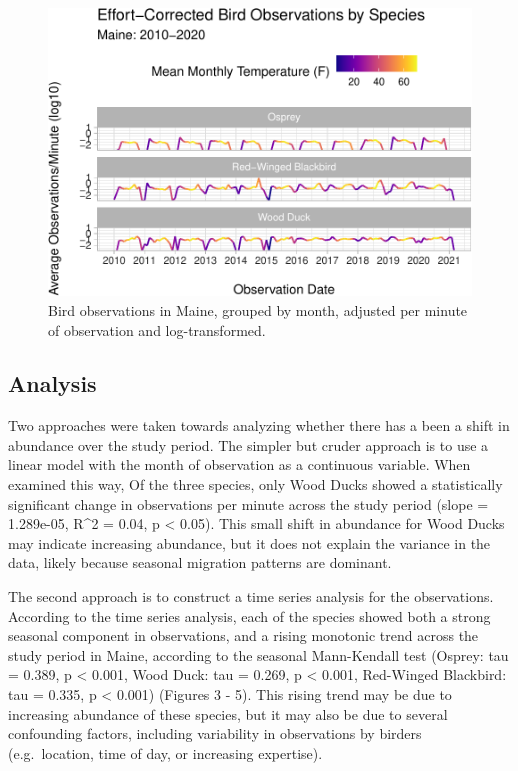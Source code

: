 \documentclass[
  12pt,
]{article}
\begin{document}
\begin{figure}
\centering
\includegraphics{Project_report_ME_files/figure-latex/monthly.log.effort-1.pdf}
\caption{Bird observations in Maine, grouped by month, adjusted per
minute of observation and log-transformed.}
\end{figure}

\newpage

\hypertarget{analysis}{%
\subsection{Analysis}\label{analysis}}

Two approaches were taken towards analyzing whether there has a been a
shift in abundance over the study period. The simpler but cruder
approach is to use a linear model with the month of observation as a
continuous variable. When examined this way, Of the three species, only
Wood Ducks showed a statistically significant change in observations per
minute across the study period (slope = 1.289e-05, R\^{}2 = 0.04, p
\textless{} 0.05). This small shift in abundance for Wood Ducks may
indicate increasing abundance, but it does not explain the variance in
the data, likely because seasonal migration patterns are dominant.

The second approach is to construct a time series analysis for the
observations. According to the time series analysis, each of the species
showed both a strong seasonal component in observations, and a rising
monotonic trend across the study period in Maine, according to the
seasonal Mann-Kendall test (Osprey: tau = 0.389, p \textless{} 0.001,
Wood Duck: tau = 0.269, p \textless{} 0.001, Red-Winged Blackbird: tau =
0.335, p \textless{} 0.001) (Figures 3 - 5). This rising trend may be
due to increasing abundance of these species, but it may also be due to
several confounding factors, including variability in observations by
birders (e.g.~location, time of day, or increasing expertise).
\end{document}
